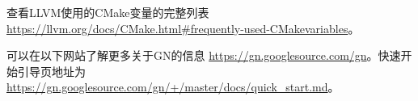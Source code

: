 查看LLVM使用的CMake变量的完整列表 \url{https://llvm.org/docs/CMake.html#frequently-used-CMakevariables}。

可以在以下网站了解更多关于GN的信息 \url{https://gn.googlesource.com/gn}。快速开始引导页地址为 \url{https://gn.googlesource.com/gn/+/master/docs/quick_start.md}。